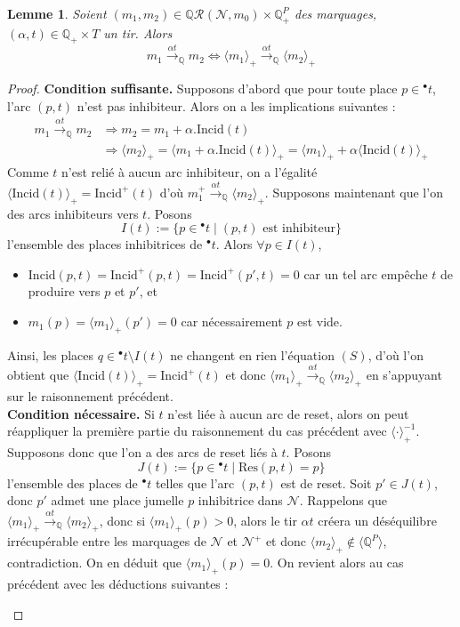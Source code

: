 \documentclass{article}
\newtheorem{lemma}{Lemme}
\theoremstyle{remark}
\theoremstyle{remark}
\newcommand{\preb}[1]{{}^\bullet #1}
\newcommand{\reach}[3][]{\mathcal{R}^{#1}(\mathcal{#2}, #3)}
\newcommand{\creach}[3][]{\mathbb{Q}\reach[#1]{#2}{#3}}
\newcommand{\reaches}[1][]{\xrightarrow{#1}}
\newcommand{\creaches}[1][]{\reaches[#1]_{\mathbb{Q}}}
\newcommand{\extend}[1][\cdot]{\langle #1 \rangle}
\newcommand{\coextend}[1][\cdot]{\extend[#1]_+}
\newcommand{\rcoextend}[1][\cdot]{\coextend[#1]^{-1}}
\newcommand{\incid}{\mathrm{Incid}}
\newcommand{\reset}{\mathrm{Res}}
\begin{document}
\begin{lemma}
    \label{lemma:net-equivalence}
    Soient $(m_1, m_2) \in \creach{N}{m_0} \times \mathbb{Q}_+^P$ des marquages, $(\alpha, t) \in \mathbb{Q}_+ \times T$ un tir. Alors
    \[m_1 \creaches[\alpha t] m_2 \Longleftrightarrow \coextend[m_1] \creaches[\alpha t] \coextend[m_2]\]
\end{lemma}

\begin{proof}
    \textbf{Condition suffisante.} Supposons d'abord que pour toute place $p \in \preb{t}$, l'arc $(p, t)$ n'est pas inhibiteur.
    Alors on a les implications suivantes : \begin{align*}
        m_1 \creaches[\alpha t] m_2 & \Longrightarrow m_2 = m_1 + \alpha.\incid(t) \\
                                    & \Longrightarrow \coextend[m_2] = \coextend[m_1 + \alpha.\incid(t)] = \coextend[m_1] + \alpha \coextend[\incid(t)]
    \end{align*}
    Comme $t$ n'est relié à aucun arc inhibiteur, on a l'égalité $\coextend[\incid(t)] = \incid^+(t)$ d'où $m_1^+ \creaches[\alpha t] \coextend[m_2]$.
    Supposons maintenant que l'on des arcs inhibiteurs vers $t$. Posons \[I(t) := \{p \in \preb{t} \mid (p, t) \text{ est inhibiteur}\}\] l'ensemble des places inhibitrices de $\preb{t}$. Alors $\forall p \in I(t)$, \begin{itemize}
        \item $\incid(p, t) = \incid^+(p, t) = \incid^+(p', t) = 0$ car un tel arc empêche $t$ de produire vers $p$ et $p'$, et
        \item $m_1(p) = \coextend[m_1](p') = 0$ car nécessairement $p$ est vide.
    \end{itemize}
    Ainsi, les places $q \in \preb{t} \setminus I(t)$ ne changent en rien l'équation $(S)$, d'où l'on obtient que $\coextend[\incid(t)] = \incid^+(t)$ et donc $\coextend[m_1] \creaches[\alpha t] \coextend[m_2]$ en s'appuyant sur le raisonnement précédent.\\
    \textbf{Condition nécessaire.} Si $t$ n'est liée à aucun arc de reset, alors on peut réappliquer la première partie du raisonnement du cas précédent avec $\rcoextend$. Supposons donc que l'on a des arcs de reset liés à $t$. Posons \[J(t) := \{p \in \preb{t} \mid \reset(p, t) = p\}\] l'ensemble des places de $\preb{t}$ telles que l'arc $(p, t)$ est de reset. Soit $p' \in J(t)$, donc $p'$ admet une place jumelle $p$ inhibitrice dans $\mathcal{N}$. Rappelons que $\coextend[m_1] \creaches[\alpha t] \coextend[m_2]$, donc si $\coextend[m_1](p) > 0$, alors le tir $\alpha t$ créera un déséquilibre irrécupérable entre les marquages de $\mathcal{N}$ et $\mathcal{N}^+$ et donc $\coextend[m_2] \notin \extend[\mathbb{Q}^P]$, contradiction. On en déduit que $\coextend[m_1](p) = 0$. On revient alors au cas précédent avec les déductions suivantes : \begin{itemize}

\end{itemize}
\end{proof}
\end{document}
